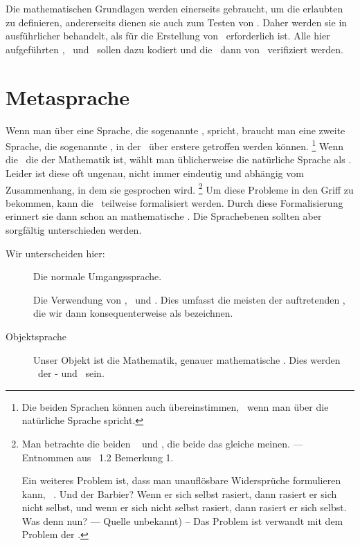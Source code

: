 Die mathematischen Grundlagen werden einerseits gebraucht, um die erlaubten \Beweisschritte{} zu definieren, andererseits dienen sie auch zum Testen von \ASBA.
Daher werden sie in  ausführlicher behandelt, als für die Erstellung von \ASBA\ erforderlich ist.
Alle hier aufgeführten \Axiome, \Saetze\ und \Beweise\ sollen dazu kodiert und die \Beweise\ dann von \ASBA\ verifiziert werden.

\section     {Metasprache}%
\label   {sec-Metasprache}

Wenn man über eine Sprache, die sogenannte , spricht, braucht man eine zweite Sprache, die sogenannte , in der \Aussagen\ über erstere getroffen werden können.%
\footnote{%
	Die beiden Sprachen können auch übereinstimmen, \textzB\ wenn man über die natürliche Sprache spricht.
}
Wenn die \Objektsprache\ die der Mathematik ist, wählt man üblicherweise die natürliche Sprache als \Metasprache.
Leider ist diese oft ungenau, nicht immer eindeutig und abhängig vom Zusammenhang, in dem sie gesprochen wird.%
\footnote{%
	Man betrachte die beiden \Aussagen\  und , die beide das gleiche meinen.
	--- Entnommen aus \cite{bib:Rautenberg} \sectionname~1.2 Bemerkung 1.

	Ein weiteres Problem ist, dass man unauflösbare Widersprüche formulieren kann, \textzB\ .
	Und der Barbier?
	Wenn er sich selbst rasiert, dann rasiert er sich nicht selbst, und wenn er sich nicht selbst rasiert, dann rasiert er sich selbst.
	Was denn nun?
	--- Quelle unbekannt) --
	Das Problem ist verwandt mit dem Problem der .
}
Um diese Probleme in den Griff zu bekommen, kann die \Metasprache\ teilweise formalisiert werden.
Durch diese Formalisierung erinnert sie dann schon an mathematische \Formeln.
Die Sprachebenen sollten aber sorgfältig unterschieden werden.

Wir unterscheiden hier:
\begin{description}
	\item[\Metasprache] Die normale Umgangssprache.
	\item[\formalisierteMetasprache] Die Verwendung von \Metaoperationen, \Mrelationen\ und \Mvariablen.
	Dies umfasst die meisten der auftretenden \Formeln, die wir dann konsequenterweise als  bezeichnen.
	\item[Objektsprache] Unser Objekt ist die Mathematik, genauer mathematische \Formeln.
	Dies werden \Formeln\ der \Aussagen- und \Praedikatenlogik\ sein.
\end{description}

